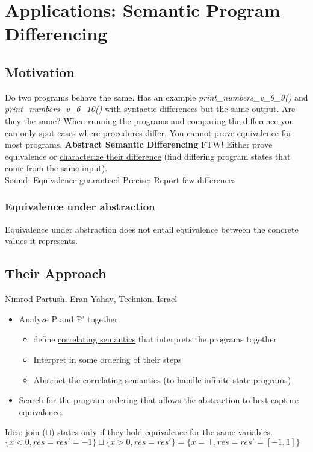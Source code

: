 \chapter{Applications: Semantic Program Differencing}
\section{Motivation}
Do two programs behave the same. Has an example \textit{print\_numbers\_v\_6\_9()} and \textit{print\_numbers\_v\_6\_10()} with syntactic differences but the same output. Are they the same? When running the programs and comparing the difference you can only spot cases where procedures differ. You cannot prove equivalence for most programs. \textbf{Abstract Semantic Differencing} FTW! Either prove equivalence or \underline{characterize their difference} (find differing program states that come from the same input).\\
\underline{Sound}: Equivalence guaranteed
\underline{Precise}: Report few differences
\subsection{Equivalence under abstraction}
Equivalence under abstraction does not entail equivalence between the concrete values it represents.
\section{Their Approach}
Nimrod Partush, Eran Yahav, Technion, Israel\\
\begin{itemize}
\item Analyze P and P' together
\begin{itemize}
\item define \underline{correlating semantics} that interprets the programs together
\item Interpret in some ordering of their steps
\item Abstract the correlating semantics (to handle infinite-state programs)
\end{itemize}
\item Search for the program ordering that allows the abstraction to \underline{best capture equivalence}.
\end{itemize}
Idea: join ($\sqcup$) states only if they hold equivalence for the same variables. \\
$\{x<0,res=res'=-1\} \sqcup \{x>0,res=res'\} = \{x = \top, res=res' = [-1,1]\}$
